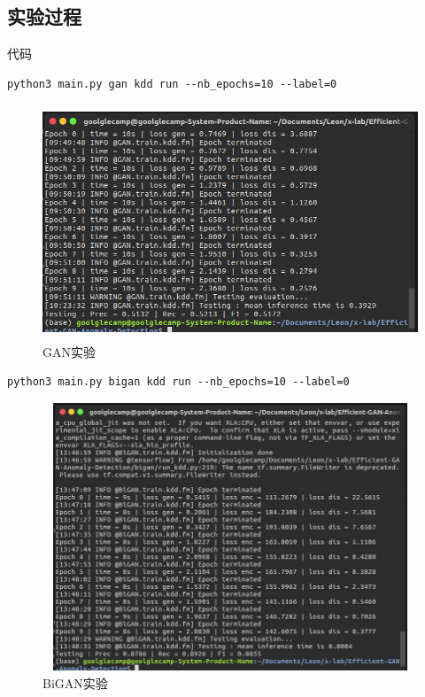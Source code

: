 \documentclass[12pt]{article}
\begin{document}
\subsection{\textbf{实验过程}\label{header-n87}}

代码

\begin{verbatim}
python3 main.py gan kdd run --nb_epochs=10 --label=0
\end{verbatim}

\begin{figure}[htbp]
\centering
\includegraphics[height=7cm,width=12cm]{Report2-figure/image-20191001134406795.png}
\caption{GAN实验}
\end{figure}

\begin{verbatim}
python3 main.py bigan kdd run --nb_epochs=10 --label=0
\end{verbatim}

\begin{figure}[htbp]
\centering
\includegraphics[height=8cm,width=12cm]{Report2-figure/image-20191001134929348.png}
\caption{BiGAN实验}
\end{figure}
\end{document}

